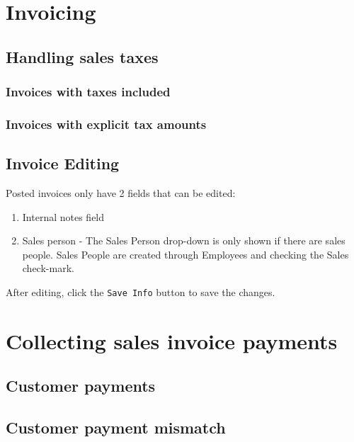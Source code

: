 \chapter{Invoicing}
\label{cha-starting-invoicing}

\section{Handling sales taxes}
\label{sec-invoicing-sales-tax}

\subsection{Invoices with taxes included}
\label{subsec-sales-tax-included}

\subsection{Invoices with explicit tax amounts}
\label{subsec-sales-tax-explicit-amount}

\section{Invoice Editing}
\label{sec-invoicing-editing}

Posted invoices only have 2 fields that can be edited:
\begin{enumerate}
\item Internal notes field
\item Sales person - The Sales Person drop-down is only shown if there are sales people. Sales People are created through Employees and checking the Sales check-mark.
\end{enumerate}
After editing, click the  \texttt{Save Info} button to save the changes.

\chapter{Collecting sales invoice payments}
\label{cha-starting-sales-customer-payments}

\section{Customer payments}
\label{sec-starting-sales-customer-payments}

\section{Customer payment mismatch}
\label{sec-starting-sales-payment-mismatch}

